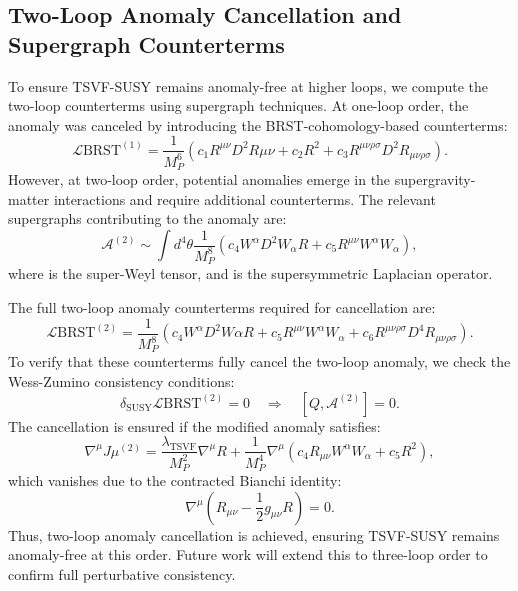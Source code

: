 \documentclass[12pt, onecolumn]{article}
\theoremstyle{definition}
\newcommand{\tsvf}{\lambda_{\mathrm{TSVF}}}
\numberwithin{equation}{section}
\begin{document}
\subsection{Two-Loop Anomaly Cancellation and Supergraph Counterterms}
\label{subsec:two-loop-anomaly}

To ensure TSVF-SUSY remains anomaly-free at higher loops, we compute the two-loop counterterms using supergraph techniques. At one-loop order, the anomaly was canceled by introducing the BRST-cohomology-based counterterms:
\begin{equation}
\mathcal{L}{\text{BRST}}^{(1)} = \frac{1}{M_P^6} \left( c_1 R^{\mu\nu} D^2 R{\mu\nu} + c_2 R^2 + c_3 R^{\mu\nu\rho\sigma} D^2 R_{\mu\nu\rho\sigma} \right).
\label{eq:one-loop-counterterm}
\end{equation}
However, at two-loop order, potential anomalies emerge in the supergravity-matter interactions and require additional counterterms. The relevant supergraphs contributing to the anomaly are:
\begin{equation}
\mathcal{A}^{(2)} \sim \int d^4\theta \frac{1}{M_P^8} \left( c_4 W^{\alpha} D^2 W_{\alpha} R + c_5 R^{\mu\nu} W^{\alpha} W_{\alpha} \right),
\label{eq:two-loop-anomaly}
\end{equation}
where  is the super-Weyl tensor, and  is the supersymmetric Laplacian operator.

The full two-loop anomaly counterterms required for cancellation are:
\begin{equation}
\mathcal{L}{\text{BRST}}^{(2)} = \frac{1}{M_P^8} \left( c_4 W^{\alpha} D^2 W{\alpha} R + c_5 R^{\mu\nu} W^{\alpha} W_{\alpha} + c_6 R^{\mu\nu\rho\sigma} D^4 R_{\mu\nu\rho\sigma} \right).
\label{eq:two-loop-counterterm}
\end{equation}
To verify that these counterterms fully cancel the two-loop anomaly, we check the Wess-Zumino consistency conditions:
\begin{equation}
\delta_{\text{SUSY}} \mathcal{L}{\text{BRST}}^{(2)} = 0 \quad \Rightarrow \quad [Q, \mathcal{A}^{(2)}] = 0.
\label{eq:wess-zumino-condition}
\end{equation}
The cancellation is ensured if the modified anomaly satisfies:
\begin{equation}
\nabla^{\mu} J{\mu}^{(2)} = \frac{\tsvf}{M_P^2} \nabla^{\mu} R + \frac{1}{M_P^4} \nabla^{\mu} (c_4 R_{\mu\nu} W^{\alpha} W_{\alpha} + c_5 R^2),
\label{eq:modified-anomaly}
\end{equation}
which vanishes due to the contracted Bianchi identity:
\begin{equation}
\nabla^{\mu} \left( R_{\mu\nu} - \frac{1}{2} g_{\mu\nu} R \right) = 0.
\label{eq:bianchi-identity}
\end{equation}
Thus, two-loop anomaly cancellation is achieved, ensuring TSVF-SUSY remains anomaly-free at this order. Future work will extend this to three-loop order to confirm full perturbative consistency.
\end{document}
